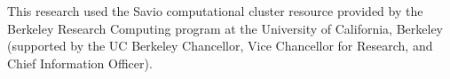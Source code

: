 \documentclass[%
 reprint,
superscriptaddress,
onecolumn,
linenumbers,
notitlepage,
 amsmath,amssymb,
 aps,
prc,
]{revtex4-1}
\newcommand{\comment}[1]{\todo[color=blue!20!white,inline]{ASV: #1}}
\begin{document}
 
This research used the Savio computational cluster resource provided by the Berkeley Research Computing program at the University of California, Berkeley (supported by the UC Berkeley Chancellor, Vice Chancellor for Research, and Chief Information Officer).

 


 
 
 
%  
\end{document}
